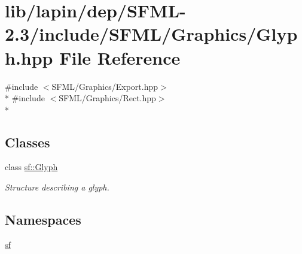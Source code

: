 \hypertarget{lapin_2dep_2_s_f_m_l-2_83_2include_2_s_f_m_l_2_graphics_2_glyph_8hpp}{\section{lib/lapin/dep/\-S\-F\-M\-L-\/2.3/include/\-S\-F\-M\-L/\-Graphics/\-Glyph.hpp File Reference}
\label{lapin_2dep_2_s_f_m_l-2_83_2include_2_s_f_m_l_2_graphics_2_glyph_8hpp}
}
{\ttfamily \#include $<$S\-F\-M\-L/\-Graphics/\-Export.\-hpp$>$}\\*
{\ttfamily \#include $<$S\-F\-M\-L/\-Graphics/\-Rect.\-hpp$>$}\\*
\subsection*{Classes}
\begin{DoxyCompactItemize}
\item 
class \hyperlink{classsf_1_1_glyph}{sf\-::\-Glyph}
\begin{DoxyCompactList}\small\item\em Structure describing a glyph. \end{DoxyCompactList}\end{DoxyCompactItemize}
\subsection*{Namespaces}
\begin{DoxyCompactItemize}
\item 
\hyperlink{namespacesf}{sf}
\end{DoxyCompactItemize}
